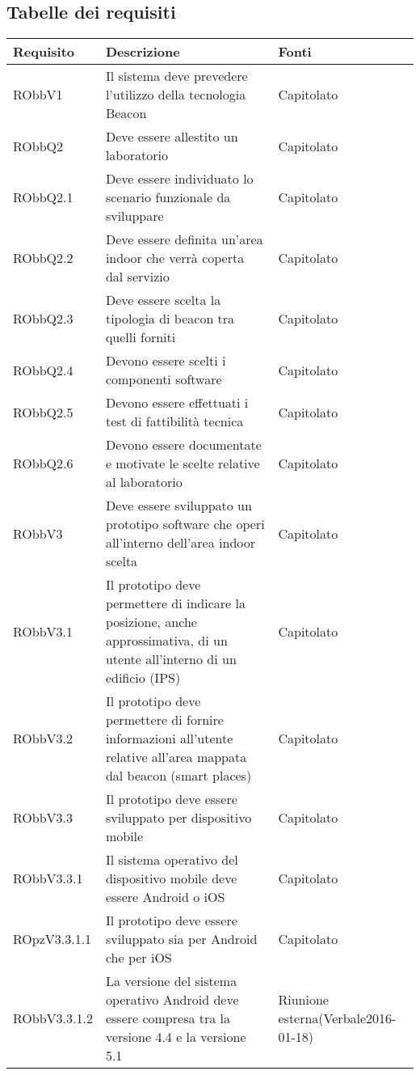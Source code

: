 \documentclass[../AnalisiDeiRequisiti.tex]{subfiles}
\begin{document}
\subsection{Tabelle dei requisiti}
\begin{longtabu} to \textwidth {X X[2] X}
	\toprule
	\textbf{Requisito} & \textbf{Descrizione} & \textbf{Fonti}\\
	\midrule
	\endhead
	RObbV1 & Il sistema deve prevedere l'utilizzo della tecnologia Beacon & Capitolato \\ 
	\midrule 
	RObbQ2 & Deve essere allestito un laboratorio & Capitolato \\ 
	\midrule 
	RObbQ2.1 & Deve essere individuato lo scenario funzionale da sviluppare & Capitolato \\ 
	\midrule 
	RObbQ2.2 & Deve essere definita un'area indoor che verrà coperta dal servizio & Capitolato \\ 
	\midrule 
	RObbQ2.3 & Deve essere scelta la tipologia di beacon tra quelli forniti & Capitolato \\ 
	\midrule 
	RObbQ2.4 & Devono essere scelti i componenti software & Capitolato \\ 
	\midrule 
	RObbQ2.5 & Devono essere effettuati i test di fattibilità tecnica & Capitolato \\ 
	\midrule 
	RObbQ2.6 & Devono essere documentate e motivate le scelte relative al laboratorio & Capitolato \\ 
	\midrule 
	RObbV3 & Deve essere sviluppato un prototipo software che operi all'interno dell'area indoor scelta & Capitolato \\ 
	\midrule 
	RObbV3.1 & Il prototipo deve permettere di indicare la posizione, anche approssimativa, di un utente all'interno di un edificio (IPS) & Capitolato \\ 
	\midrule 
	RObbV3.2 & Il prototipo deve permettere di fornire informazioni all'utente relative all'area mappata dal beacon (smart places) & Capitolato \\ 
	\midrule 
	RObbV3.3 & Il prototipo deve essere sviluppato per dispositivo mobile & Capitolato \\ 
	\midrule 
	RObbV3.3.1 & Il sistema operativo del dispositivo mobile deve essere Android o iOS & Capitolato \\ 
	\midrule 
	ROpzV3.3.1.1 & Il prototipo deve essere sviluppato sia per Android che per iOS & Capitolato \\ 
	\midrule 
	RObbV3.3.1.2 & La versione del sistema operativo Android deve essere compresa tra la versione 4.4 e la versione 5.1 & Riunione esterna(Verbale2016-01-18) \\ 

\end{longtabu}
\end{document}

